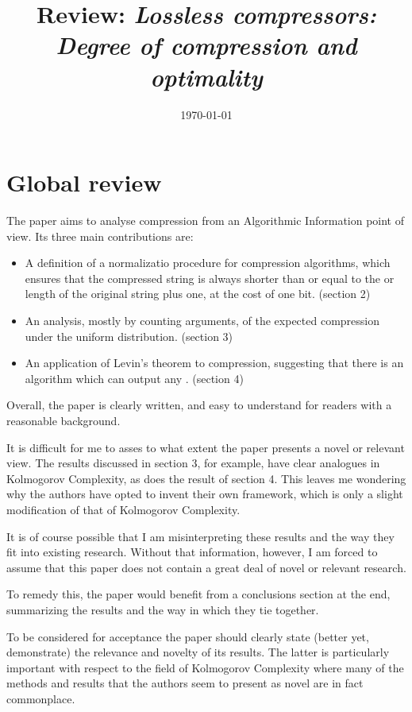 \documentclass{article}
\title{Review: {\em Lossless compressors: Degree of compression and optimality}}
\date{\today}
\theoremstyle{definition}
\begin{document}
\maketitle

\section{Global review}

The paper aims to analyse compression from an Algorithmic Information point of view. Its three main contributions are:
\begin{itemize}
  \item A definition of a normalizatio procedure for compression algorithms, which ensures that the compressed string is always shorter than or equal to the or length of the original string plus one, at the cost of one bit. (section 2)
  \item An analysis, mostly by counting arguments, of the expected compression under the uniform distribution. (section 3)
  \item An application of Levin's theorem to compression, suggesting that there is an algorithm which can output any . (section 4)
\end{itemize}

Overall, the paper is clearly written, and easy to understand for readers with a reasonable background.

It is difficult for me to asses to what extent the paper presents a novel or relevant view. The results discussed in section 3, for example, have clear analogues in Kolmogorov Complexity, as does the result of section 4. This leaves me wondering why the authors have opted to invent their own framework, which is only a slight modification of that of Kolmogorov Complexity.

It is of course possible that I am misinterpreting these results and the way they fit into existing research. Without that information, however, I am
forced to assume that this paper does not contain a great deal of novel or relevant research.

To remedy this, the paper would benefit from a conclusions section at the end, summarizing the results and the way in which they tie together.

To be considered for acceptance the paper should clearly state (better yet, demonstrate) the relevance and novelty of its results. The latter is particularly important with respect to the field of Kolmogorov Complexity where many of the methods and results that the authors seem to present as novel are in fact commonplace.
\end{document}
